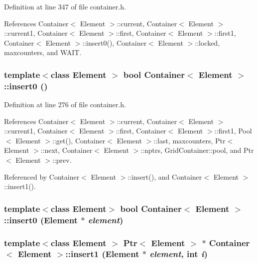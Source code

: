 Definition at line 347 of file container.h.

References Container$<$ Element $>$::current, Container$<$ Element $>$::current1, Container$<$ Element $>$::first, Container$<$ Element $>$::first1, Container$<$ Element $>$::insert0(), Container$<$ Element $>$::locked, maxcounters, and WAIT.\hypertarget{classContainer_250314d35026b7b6deffc55c8cf91191}{
\subsubsection[{insert0}]{\setlength{\rightskip}{0pt plus 5cm}template$<$class Element $>$ bool {\bf Container}$<$ Element $>$::insert0 ()}}
\label{classContainer_250314d35026b7b6deffc55c8cf91191}




Definition at line 276 of file container.h.

References Container$<$ Element $>$::current, Container$<$ Element $>$::current1, Container$<$ Element $>$::first, Container$<$ Element $>$::first1, Pool$<$ Element $>$::get(), Container$<$ Element $>$::last, maxcounters, Ptr$<$ Element $>$::next, Container$<$ Element $>$::nptrs, GridContainer::pool, and Ptr$<$ Element $>$::prev.

Referenced by Container$<$ Element $>$::insert(), and Container$<$ Element $>$::insert1().\hypertarget{classContainer_5968e932231e338cb211e70d2c9bcfbc}{
\subsubsection[{insert0}]{\setlength{\rightskip}{0pt plus 5cm}template$<$class Element$>$ bool {\bf Container}$<$ Element $>$::insert0 (Element $\ast$ {\em element})}}
\label{classContainer_5968e932231e338cb211e70d2c9bcfbc}


\hypertarget{classContainer_97c70762ea56e7dc73e2aa7818a1aa0d}{
\subsubsection[{insert1}]{\setlength{\rightskip}{0pt plus 5cm}template$<$class Element $>$ {\bf Ptr}$<$ Element $>$ $\ast$ {\bf Container}$<$ Element $>$::insert1 (Element $\ast$ {\em element}, \/  int {\em i})}}
\label{classContainer_97c70762ea56e7dc73e2aa7818a1aa0d}




